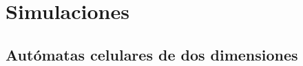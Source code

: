 \section{Simulaciones}
\label{sec:simulaciones}

\subsection{Autómatas celulares de dos dimensiones}
\label{subsec:simul2d}